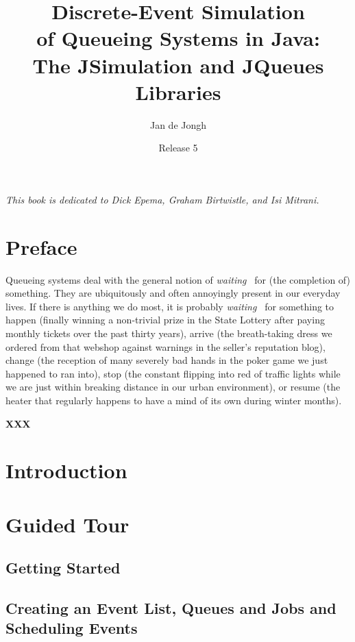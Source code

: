 \documentclass[12pt]{book}
\title{Discrete-Event Simulation\\
       of Queueing Systems in Java:\\
       The JSimulation and JQueues Libraries}
\author{Jan de Jongh}
\date{Release 5}
\begin{document}
\maketitle

\chapter*{}

{\em This book is dedicated to Dick Epema, Graham Birtwistle, and Isi Mitrani.}

\tableofcontents

\chapter{Preface}

Queueing systems deal with the general notion of {\em waiting\ }
  for (the completion of) something.
They are ubiquitously and often annoyingly present in our everyday lives.
If there is anything we do most,
  it is probably {\em waiting\ } for something to
  happen (finally winning a non-trivial prize in the State Lottery
          after paying monthly tickets over the past thirty years),
  arrive (the breath-taking dress we ordered from that webshop
          against warnings in the seller's reputation blog),
  change (the reception of many severely bad hands in the poker game
          we just happened to ran into),
  stop (the constant flipping into red of traffic lights
        while we are just within breaking distance
        in our urban environment),
  or resume (the heater that regularly happens to have
             a mind of its own during
             winter months).

{\bf XXX}

\chapter{Introduction}
\label{chap:intro}

\chapter{Guided Tour}
\label{chap:guided}

\section{Getting Started}
\label{sec:guided:getting-started}

\section{Creating an Event List, Queues and Jobs and Scheduling Events}
\label{sec:guided:eventlist-queues-jobs-events}
\end{document}

